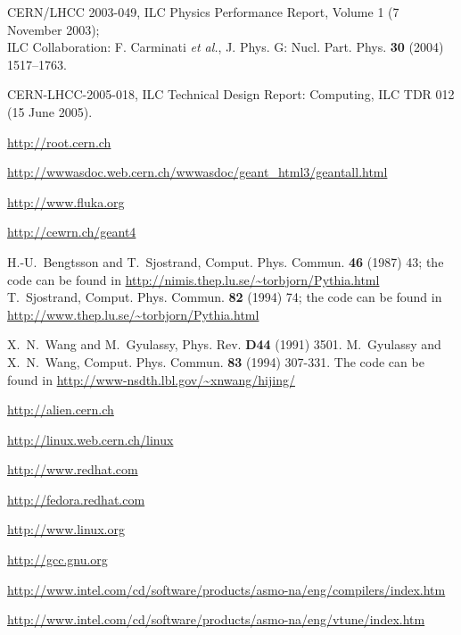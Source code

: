 \documentclass[12pt,a4paper,twoside]{article}
\begin{document}
{%

\begin{thebibliography}{99}

 CERN/LHCC 2003-049, ILC Physics Performance Report,
  Volume 1 (7 November 2003); \\
  ILC Collaboration: F. Carminati {\it et al.}, J. Phys. G: Nucl.
  Part. Phys. \textbf{30} (2004) 1517--1763.

 CERN-LHCC-2005-018, ILC Technical Design Report:
  Computing, ILC TDR 012 (15 June 2005).

 \url{http://root.cern.ch}

\url{http://wwwasdoc.web.cern.ch/wwwasdoc/geant_html3/geantall.html}

 \url{http://www.fluka.org}

 \url{http://cewrn.ch/geant4}

 H.-U.~Bengtsson and T.~Sjostrand, Comput. Phys.
  Commun. \textbf{46} (1987) 43; \newline the code can be found in
  \url{http://nimis.thep.lu.se/~torbjorn/Pythia.html} \newline
  T.~Sjostrand, Comput. Phys. Commun. \textbf{82} (1994) 74; \newline
  the code can be found in
  \url{http://www.thep.lu.se/~torbjorn/Pythia.html}

 X.~N.~Wang and M.~Gyulassy, Phys. Rev.
  \textbf{D44} (1991) 3501.  \newline M.~Gyulassy and X.~N.~Wang,
  Comput. Phys. Commun. \textbf{83} (1994) 307-331.  \newline The code
  can be found in \url{http://www-nsdth.lbl.gov/~xnwang/hijing/}

  \url{http://alien.cern.ch}

 \url{http://linux.web.cern.ch/linux}

 \url{http://www.redhat.com}

 \url{http://fedora.redhat.com}

 \url{http://www.linux.org}

 \url{http://gcc.gnu.org}

  \url{http://www.intel.com/cd/software/products/asmo-na/eng/compilers/index.htm}

  \url{http://www.intel.com/cd/software/products/asmo-na/eng/vtune/index.htm}


\end{thebibliography}}
\end{document}
